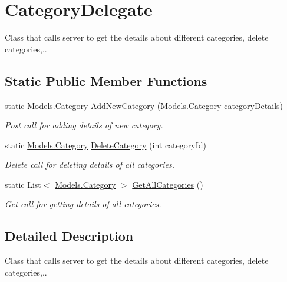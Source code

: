 \hypertarget{classWildlifeTrackingApp_1_1Delegates_1_1CategoryDelegate}{}\section{Category\+Delegate}
\label{classWildlifeTrackingApp_1_1Delegates_1_1CategoryDelegate}


Class that calls server to get the details about different categories, delete categories,..  


\subsection*{Static Public Member Functions}
\begin{DoxyCompactItemize}
\item 
static \hyperlink{classWildlifeTrackingApp_1_1Models_1_1Category}{Models.\+Category} \hyperlink{classWildlifeTrackingApp_1_1Delegates_1_1CategoryDelegate_addca73f407ae2c8d31d5b19067e6dce7}{Add\+New\+Category} (\hyperlink{classWildlifeTrackingApp_1_1Models_1_1Category}{Models.\+Category} category\+Details)
\begin{DoxyCompactList}\small\item\em Post call for adding details of new category. \end{DoxyCompactList}\item 
static \hyperlink{classWildlifeTrackingApp_1_1Models_1_1Category}{Models.\+Category} \hyperlink{classWildlifeTrackingApp_1_1Delegates_1_1CategoryDelegate_ad3b0dad81563543b37fd3cc8688de0c7}{Delete\+Category} (int category\+Id)
\begin{DoxyCompactList}\small\item\em Delete call for deleting details of all categories. \end{DoxyCompactList}\item 
static List$<$ \hyperlink{classWildlifeTrackingApp_1_1Models_1_1Category}{Models.\+Category} $>$ \hyperlink{classWildlifeTrackingApp_1_1Delegates_1_1CategoryDelegate_a8c9a78152f0a7e86dc3ea0b828cdfd77}{Get\+All\+Categories} ()
\begin{DoxyCompactList}\small\item\em Get call for getting details of all categories. \end{DoxyCompactList}\end{DoxyCompactItemize}


\subsection{Detailed Description}
Class that calls server to get the details about different categories, delete categories,.. 



